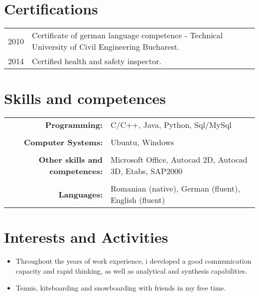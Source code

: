\documentclass[a4paper,10pt]{article} %
\begin{document}

\section*{Certifications}

\begin{tabular}{r|p{15cm}}
2010 & Certificate of german language competence - Technical University of Civil Engineering Bucharest.\\
2014 & Certified health and safety inspector.\\
\end{tabular}


\section*{Skills and competences}

\begin{tabular}{rl}
\textbf{Programming:} & C/C++, Java, Python, Sql/MySql\\
& \\
\textbf{Computer Systems:} & Ubuntu, Windows\\
& \\\textbf{Other skills and competences:} & Microsoft Office, Autocad 2D, Autocad 3D, Etabs, SAP2000 \\
& \\
\textbf{Languages:} & Romanian (native), German (fluent), English (fluent)
\end{tabular}


\section*{Interests and Activities}
\begin{itemize}

 \item Throughout the years of work experience, i developed a good communication capacity and rapid thinking, as well as analytical and synthesis capabilities.\\

  \item Tennis, kiteboarding and snowboarding with friends in my free time. \\
  
\end{itemize}




\end{document}
